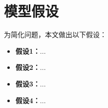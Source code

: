 %
\section{模型假设}

为简化问题，本文做出以下假设：

\begin{itemize}[itemindent=2em]
\item \textbf{假设1：}...
\item \textbf{假设2：}...
\item \textbf{假设3：}...
\item \textbf{假设4：}...
\end{itemize}
